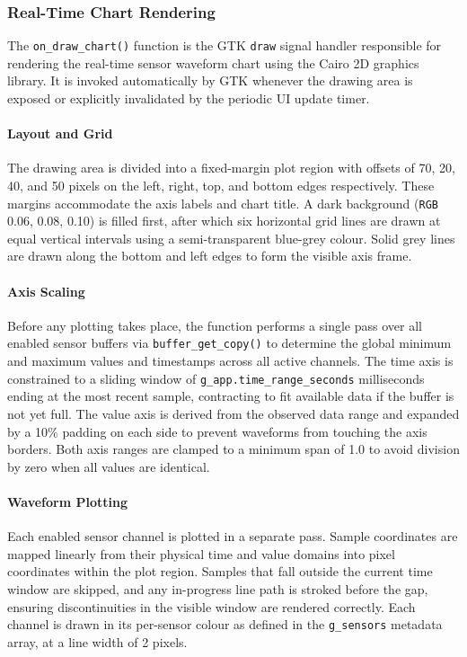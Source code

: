 \subsubsection{Real-Time Chart Rendering}

The \texttt{on\_draw\_chart()} function is the GTK \texttt{draw} signal
handler responsible for rendering the real-time sensor waveform chart
using the Cairo 2D graphics library. It is invoked automatically by GTK
whenever the drawing area is exposed or explicitly invalidated by the
periodic UI update timer.

\paragraph{Layout and Grid}
The drawing area is divided into a fixed-margin plot region with offsets
of 70, 20, 40, and 50 pixels on the left, right, top, and bottom edges
respectively. These margins accommodate the axis labels and chart title.
A dark background (\texttt{RGB} 0.06, 0.08, 0.10) is filled first, after
which six horizontal grid lines are drawn at equal vertical intervals
using a semi-transparent blue-grey colour. Solid grey lines are drawn
along the bottom and left edges to form the visible axis frame.

\paragraph{Axis Scaling}
Before any plotting takes place, the function performs a single pass over
all enabled sensor buffers via \texttt{buffer\_get\_copy()} to determine
the global minimum and maximum values and timestamps across all active
channels. The time axis is constrained to a sliding window of
\texttt{g\_app.time\_range\_seconds} milliseconds ending at the most
recent sample, contracting to fit available data if the buffer is not yet
full. The value axis is derived from the observed data range and expanded
by a 10\% padding on each side to prevent waveforms from touching the
axis borders. Both axis ranges are clamped to a minimum span of 1.0 to
avoid division by zero when all values are identical.

\paragraph{Waveform Plotting}
Each enabled sensor channel is plotted in a separate pass. Sample
coordinates are mapped linearly from their physical time and value
domains into pixel coordinates within the plot region. Samples that fall
outside the current time window are skipped, and any in-progress line
path is stroked before the gap, ensuring discontinuities in the visible
window are rendered correctly. Each channel is drawn in its
per-sensor colour as defined in the \texttt{g\_sensors} metadata array,
at a line width of 2 pixels.


